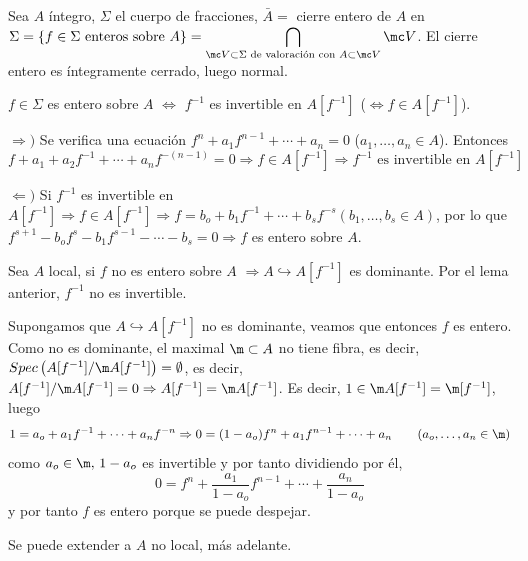 \begin{teo}
    Sea $A$ \'integro, $\Sigma$ el cuerpo de fracciones, $\bar A = $ cierre entero de $A$ en $\displaystyle \Sigma = \{f\in \Sigma \text{ enteros sobre }A\} = \bigcap_{\mc V \subset \Sigma \text{ de valoraci\'on con } A \subset \mc V} \mc V$. El cierre entero es \'integramente cerrado, luego normal.
\end{teo}
\begin{lem}
    $f \in \Sigma$ es entero sobre $A$ $\iff$ $f^{-1}$ es invertible en $A[f^{-1}]$ ($\iff f\in A[f^{-1}]$). 
\end{lem}
\begin{dem}
    $\Rightarrow)$ Se verifica una ecuaci\'on $f^n+ a_1 f^{n-1} + \cdots +a_n= 0 $ ($a_1, \ldots, a_n \in A$). Entonces
    $$f+a_1 + a_2 f^{-1} + \cdots + a_nf^{-(n-1)} = 0 \Rightarrow f\in A[f^{-1}] \Rightarrow f^{-1} \text{ es invertible en }A[f^{-1}]$$

    $\Leftarrow)$ Si $f^{-1}$ es invertible en $A[f^{-1}] \Rightarrow f\in A[f^{-1}] \Rightarrow f = b_o + b_1 f^{-1} + \cdots  + b_s f^{-s} (b_1, \ldots, b_s \in A)$, por lo que $f^{s+1} -b_o f^s - b_1 f^{s-1} - \cdots - b_s = 0 \Rightarrow f$ es entero sobre $A$.
\end{dem} 
\begin{lem}
    Sea $A$ local, si $f$ no es entero sobre $A$ $\Rightarrow A \hookrightarrow A[f^{-1}]$ es dominante. Por el lema anterior, $f^{-1}$ no es invertible. 
\end{lem}
\begin{dem}
    Supongamos que $A \hookrightarrow A[f^{-1}]$ no es dominante, veamos que entonces $f$ es entero. Como no es dominante, el maximal $\m\subset A$ no tiene fibra, es decir, $Spec\left(A[f^{-1}] / \m A[f^{-1}] \right) = \emptyset$, es decir, $A[f^{-1}] / \m A[f^{-1}] = 0 \Rightarrow A[f^{-1}] = \m A[f^{-1}]$. Es decir, $1\in \m A[f^{-1}]=\m[f^{-1}]$, luego 
    $$1=a_o + a_1f^{-1} + \cdots + a_n f^{-n} \Rightarrow 0 = (1-a_o) f^n+a_1f^{n-1} + \cdots + a_n  \qquad (a_o, \ldots, a_n \in \m)$$
    como $a_o \in \m, \, 1-a_o$ es invertible y por tanto dividiendo por \'el, 
    $$0 = f^n + \frac{a_1}{1-a_o} f^{n-1} + \cdots + \frac{a_n}{1-a_o}$$
    y por tanto $f$ es entero porque se puede despejar. 

    Se puede extender a $A$ no local, m\'as adelante. 
\end{dem}
